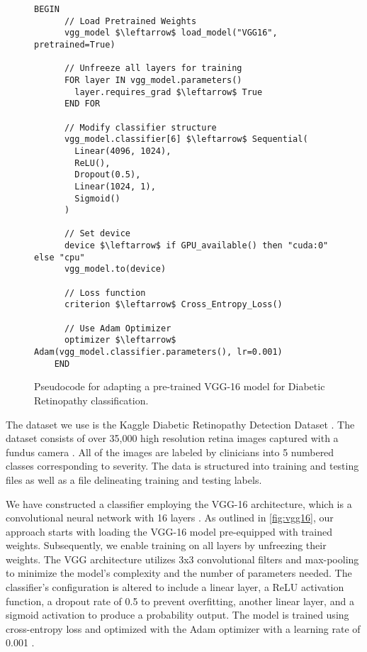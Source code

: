 \begin{figure*}[h]
  \centering
  \begin{minipage}{\textwidth}
    \centering
    \begin{lstlisting}[]
    BEGIN
      // Load Pretrained Weights
      vgg_model $\leftarrow$ load_model("VGG16", pretrained=True)

      // Unfreeze all layers for training
      FOR layer IN vgg_model.parameters()
        layer.requires_grad $\leftarrow$ True
      END FOR

      // Modify classifier structure
      vgg_model.classifier[6] $\leftarrow$ Sequential(
        Linear(4096, 1024),
        ReLU(),
        Dropout(0.5),
        Linear(1024, 1),
        Sigmoid()
      )

      // Set device
      device $\leftarrow$ if GPU_available() then "cuda:0" else "cpu"
      vgg_model.to(device)

      // Loss function
      criterion $\leftarrow$ Cross_Entropy_Loss()

      // Use Adam Optimizer
      optimizer $\leftarrow$ Adam(vgg_model.classifier.parameters(), lr=0.001)
    END
    \end{lstlisting}
    \caption{Pseudocode for adapting a pre-trained VGG-16 model for Diabetic Retinopathy classification.}
    \label{fig:vgg16}
  \end{minipage}%
\end{figure*}

The dataset we use is the Kaggle Diabetic Retinopathy Detection Dataset \cite{emma_dugas_diabetic_2015}. The dataset consists of over 35,000 high resolution retina images captured with a fundus camera \cite{emma_dugas_diabetic_2015, mateen_fundus_2019}. All of the images are labeled by clinicians into 5 numbered classes corresponding to severity. The data is structured into training and testing files as well as a file delineating training and testing labels.

We have constructed a classifier employing the VGG-16 architecture, which is a convolutional neural network with 16 layers \cite{simonyan_very_2015}. As outlined in \autoref{fig:vgg16}, our approach starts with loading the VGG-16 model pre-equipped with trained weights. Subsequently, we enable training on all layers by unfreezing their weights. The VGG architecture utilizes 3x3 convolutional filters and max-pooling to minimize the model's complexity and the number of parameters needed. The classifier's configuration is altered to include a linear layer, a ReLU activation function, a dropout rate of 0.5 to prevent overfitting, another linear layer, and a sigmoid activation to produce a probability output. The model is trained using cross-entropy loss and optimized with the Adam optimizer with a learning rate of 0.001  \cite{zhang_generalized_2018, kingma_adam_2017}.

